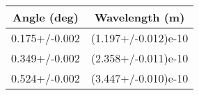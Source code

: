 \begin{tabular}{c|c}
Angle (deg) & Wavelength (m) \\
\hline
0.175+/-0.002 & (1.197+/-0.012)e-10 \\
0.349+/-0.002 & (2.358+/-0.011)e-10 \\
0.524+/-0.002 & (3.447+/-0.010)e-10 \\
\end{tabular}
